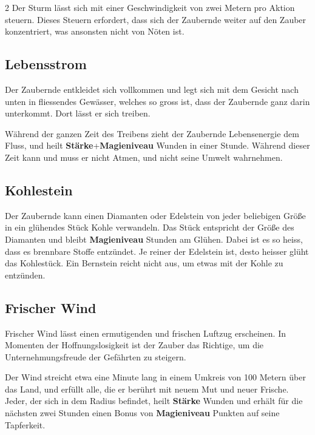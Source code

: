 \begin{multicols*}{2}
Der Sturm lässt sich mit einer Geschwindigkeit von zwei Metern pro Aktion steuern. Dieses Steuern erfordert, dass sich der Zaubernde weiter auf den Zauber konzentriert, was ansonsten nicht von Nöten ist.



\subsection{Lebensstrom}

Der Zaubernde entkleidet sich vollkommen und legt sich mit dem Gesicht nach unten in fliessendes Gewässer, welches so gross ist, dass der Zaubernde ganz darin unterkommt. Dort lässt er sich treiben.

Während der ganzen Zeit des Treibens zieht der Zaubernde Lebensenergie dem Fluss, und heilt \textbf{Stärke}+\textbf{Magieniveau} Wunden in einer Stunde. Während dieser Zeit kann und muss er nicht Atmen, und nicht seine Umwelt wahrnehmen.



\subsection{Kohlestein}

Der Zaubernde kann einen Diamanten oder Edelstein von jeder beliebigen Größe in ein glühendes Stück Kohle verwandeln. Das Stück entspricht der Größe des Diamanten und bleibt \textbf{Magieniveau} Stunden am Glühen. Dabei ist es so heiss, dass es brennbare Stoffe entzündet. Je reiner der Edelstein ist, desto heisser glüht das Kohlestück. Ein Bernstein reicht nicht aus, um etwas mit der Kohle zu entzünden.



\subsection{Frischer Wind}

Frischer Wind lässt einen ermutigenden und frischen Luftzug erscheinen. In Momenten der Hoffnungslosigkeit ist der Zauber das Richtige, um die Unternehmungsfreude der Gefährten zu steigern.

Der Wind streicht etwa eine Minute lang in einem Umkreis von 100 Metern über das Land, und erfüllt alle, die er berührt mit neuem Mut und neuer Frische. Jeder, der sich in dem Radius befindet, heilt \textbf{Stärke} Wunden und erhält für die nächsten zwei Stunden einen Bonus von \textbf{Magieniveau} Punkten auf seine Tapferkeit.


\end{multicols*}

